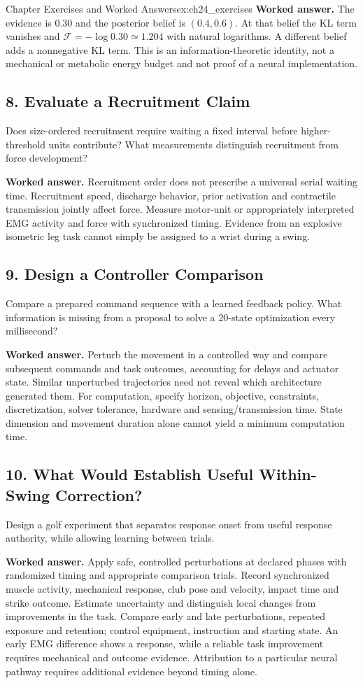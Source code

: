 \begin{exercises}{Chapter Exercises and Worked Answers}{ex:ch24_exercises}
\textbf{Worked answer.} The evidence is 0.30 and the posterior belief is $(0.4,0.6)$. At that belief the KL term vanishes and $\mathcal F=-\log0.30\simeq1.204$ with natural logarithms. A different belief adds a nonnegative KL term. This is an information-theoretic identity, not a mechanical or metabolic energy budget and not proof of a neural implementation.

\subsection*{8. Evaluate a Recruitment Claim}
Does size-ordered recruitment require waiting a fixed interval before higher-threshold units contribute? What measurements distinguish recruitment from force development?

\textbf{Worked answer.} Recruitment order does not prescribe a universal serial waiting time. Recruitment speed, discharge behavior, prior activation and contractile transmission jointly affect force. Measure motor-unit or appropriately interpreted EMG activity and force with synchronized timing. Evidence from an explosive isometric leg task cannot simply be assigned to a wrist during a swing.

\subsection*{9. Design a Controller Comparison}
Compare a prepared command sequence with a learned feedback policy. What information is missing from a proposal to solve a 20-state optimization every millisecond?

\textbf{Worked answer.} Perturb the movement in a controlled way and compare subsequent commands and task outcomes, accounting for delays and actuator state. Similar unperturbed trajectories need not reveal which architecture generated them. For computation, specify horizon, objective, constraints, discretization, solver tolerance, hardware and sensing/transmission time. State dimension and movement duration alone cannot yield a minimum computation time.

\subsection*{10. What Would Establish Useful Within-Swing Correction?}
Design a golf experiment that separates response onset from useful response authority, while allowing learning between trials.

\textbf{Worked answer.} Apply safe, controlled perturbations at declared phases with randomized timing and appropriate comparison trials. Record synchronized muscle activity, mechanical response, club pose and velocity, impact time and strike outcome. Estimate uncertainty and distinguish local changes from improvements in the task. Compare early and late perturbations, repeated exposure and retention; control equipment, instruction and starting state. An early EMG difference shows a response, while a reliable task improvement requires mechanical and outcome evidence. Attribution to a particular neural pathway requires additional evidence beyond timing alone.
\end{exercises}
\flushbottom{}
\newpage
